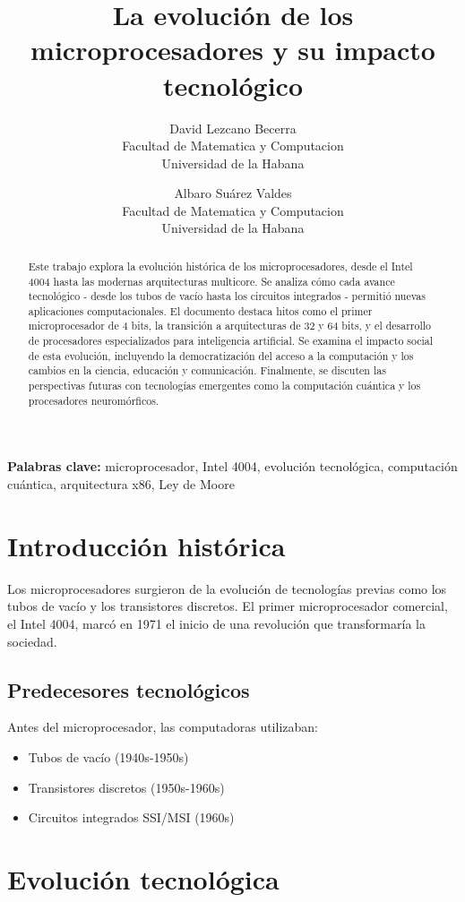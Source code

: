 \documentclass[]{article}
\title{La evolución de los microprocesadores y su impacto tecnológico}
\author{David Lezcano Becerra \\ Facultad de Matematica y Computacion \\ Universidad de la Habana }
\author{Albaro Suárez Valdes \\ Facultad de Matematica y Computacion \\ Universidad de la Habana }
\begin{document}
\maketitle

\begin{abstract}
Este trabajo explora la evolución histórica de los microprocesadores, desde el Intel 4004 hasta las modernas arquitecturas multicore. Se analiza cómo cada avance tecnológico - desde los tubos de vacío hasta los circuitos integrados - permitió nuevas aplicaciones computacionales. El documento destaca hitos como el primer microprocesador de 4 bits, la transición a arquitecturas de 32 y 64 bits, y el desarrollo de procesadores especializados para inteligencia artificial. Se examina el impacto social de esta evolución, incluyendo la democratización del acceso a la computación y los cambios en la ciencia, educación y comunicación. Finalmente, se discuten las perspectivas futuras con tecnologías emergentes como la computación cuántica y los procesadores neuromórficos.
\end{abstract}

\textbf{Palabras clave:} microprocesador, Intel 4004, evolución tecnológica, computación cuántica, arquitectura x86, Ley de Moore

\section{Introducción histórica}
Los microprocesadores surgieron de la evolución de tecnologías previas como los tubos de vacío y los transistores discretos\cite{Steve_Jobs}. El primer microprocesador comercial, el Intel 4004\cite{Steve_Jobs}, marcó en 1971 el inicio de una revolución que transformaría la sociedad.

\subsection{Predecesores tecnológicos}
Antes del microprocesador, las computadoras utilizaban:
\begin{itemize}
\item Tubos de vacío (1940s-1950s)
\item Transistores discretos (1950s-1960s)
\item Circuitos integrados SSI/MSI (1960s)
\end{itemize}

\section{Evolución tecnológica}
\end{document}
